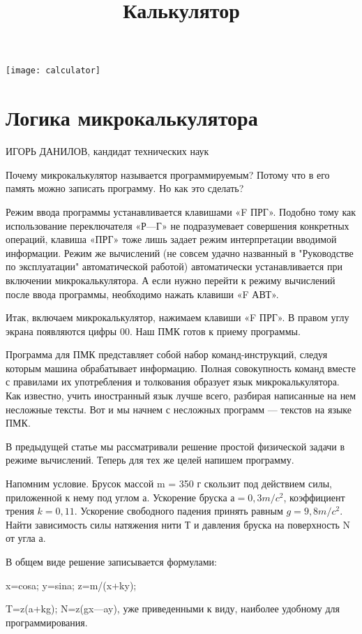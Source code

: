 \documentclass[11pt,a4paper,oneside]{article}
\title{Калькулятор}
\begin{document}
\maketitle
\tableofcontents
\pagebreak

\texttt{[image: calculator]}
\section{Логика микрокалькулятора}
ИГОРЬ ДАНИЛОВ, кандидат технических наук

Почему микрокалькулятор называется программируемым? Потому что в его память можно записать программу. Но как это сделать?

Режим ввода программы устанавливается клавишами «F ПРГ». Подобно тому как использование переключателя «Р—Г» не подразумевает совершения конкретных операций, клавиша «ПРГ» тоже лишь задает режим интерпретации вводимой информации. Режим же вычислений (не совсем удачно названный в "Руководстве по эксплуатации" автоматической работой) автоматически устанавливается при включении микрокалькулятора. А если нужно перейти к режиму вычислений после ввода программы, необходимо нажать клавиши «F АВТ».

Итак, включаем микрокалькулятор, нажимаем клавиши «F ПРГ». В правом углу экрана появляются цифры 00. Наш ПМК готов к приему программы.

Программа для ПМК представляет собой набор команд-инструкций, следуя которым машина обрабатывает информацию. Полная совокупность команд вместе с правилами их употребления и толкования образует язык микрокалькулятора. Как известно, учить иностранный язык лучше всего, разбирая написанные на нем несложные тексты. Вот и мы начнем с несложных программ — текстов на языке ПМК.

В предыдущей статье мы рассматривали решение простой физической задачи в режиме вычислений. Теперь для тех же целей напишем программу.

Напомним условие. Брусок массой m = 350 г скользит под действием силы, приложенной к нему под углом а. Ускорение бруска $а=0,3 m/c^{2}$, коэффициент трения $k=0,11$. Ускорение свободного падения принять равным $g=9,8 m/c^{2}$. Найти зависимость силы натяжения нити Т и давления бруска на поверхность N от угла а.

В общем виде решение записывается формулами:

x=cosa; y=sina; z=m/(x+ky);

T=z(a+kg); N=z(gx—ay), уже приведенными к виду, наиболее удобному для программирования.
\end{document}
